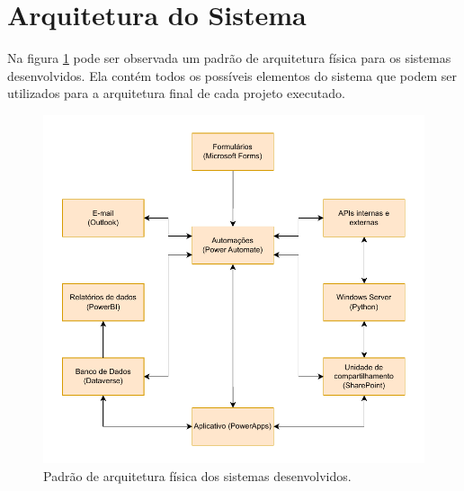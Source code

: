 	\section{Arquitetura do Sistema}

	Na figura \ref{fig:metodologia:arquiteturaFisica} pode ser observada um padrão de arquitetura física para os sistemas desenvolvidos. Ela contém todos os possíveis
	elementos do sistema que podem ser utilizados para a arquitetura final de cada projeto executado. 
	\begin{figure}[h]
		\centering
		\includegraphics[width=1\textwidth]{./figuras/arquiteturaFisica.pdf}
		\caption{Padrão de arquitetura física dos sistemas desenvolvidos.}
		\label{fig:metodologia:arquiteturaFisica}
	\end{figure}

